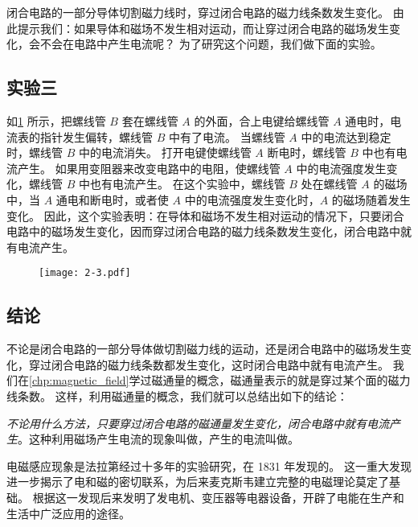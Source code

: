 \medskip
闭合电路的一部分导体切割磁力线时，穿过闭合电路的磁力线条数发生变化。
由此提示我们：如果导体和磁场不发生相对运动，而让穿过闭合电路的磁场发生变化，会不会在电路中产生电流呢？
为了研究这个问题，我们做下面的实验。

\subsection*{实验三}
如\cref{fig:2-3} 所示，把螺线管 $B$ 套在螺线管 $A$ 的外面，合上电键给螺线管 $A$ 通电时，电流表的指针发生偏转，螺线管 $B$ 中有了电流。
当螺线管 $A$ 中的电流达到稳定时，螺线管 $B$ 中的电流消失。
打开电键使螺线管 $A$ 断电时，螺线管 $B$ 中也有电流产生。
如果用变阻器来改变电路中的电阻，使螺线管 $A$ 中的电流强度发生变化，螺线管 $B$ 中也有电流产生。
在这个实验中，螺线管 $B$ 处在螺线管 $A$ 的磁场中，当 $A$ 通电和断电时，或者使 $A$ 中的电流强度发生变化时，$A$ 的磁场随着发生变化。
因此，这个实验表明：在导体和磁场不发生相对运动的情况下，只要闭合电路中的磁场发生变化，因而穿过闭合电路的磁力线条数发生变化，闭合电路中就有电流产生。
\begin{figure}
\texttt{[image: 2-3.pdf]}
\caption{}\label{fig:2-3}
\end{figure}

\subsection*{结论}
不论是闭合电路的一部分导体做切割磁力线的运动，还是闭合电路中的磁场发生变化，穿过闭合电路的磁力线条数都发生变化，这时闭合电路中就有电流产生。
我们在\cref{chp:magnetic_field}学过磁通量的概念，磁通量表示的就是穿过某个面的磁力线条数。
这样，利用磁通量的概念，我们就可以总结出如下的结论：

\emph{不论用什么方法，只要穿过闭合电路的磁通量发生变化，闭合电路中就有电流产生}。这种利用磁场产生电流的现象叫做，产生的电流叫做。

电磁感应现象是法拉第经过十多年的实验研究，在 1831 年发现的。
这一重大发现进一步揭示了电和磁的密切联系，为后来麦克斯韦建立完整的电磁理论莫定了基础。
根据这一发现后来发明了发电机、变压器等电器设备，开辟了电能在生产和生活中广泛应用的途径。

